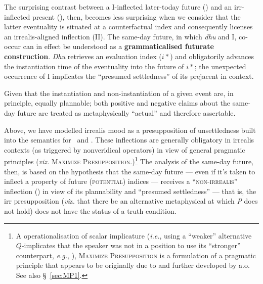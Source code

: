 The surprising contrast between a \gls{I}-inflected later-today future () and an \gls{irr}-inflected present (), then, becomes less surprising when we consider that the latter eventuality is situated at a counterfactual index and consequently licenses an irrealis-aligned inflection (\gls{II}). The same-day future, in which \textit{dhu} and \gls{I}, co-occur can in effect be understood as a \textbf{grammaticalised futurate construction}. \textit{Dhu} retrieves an evaluation index ($ i* $) and obligatorily advances the instantiation time of the eventuality into the future of $ i* $; the unexpected occurrence of \gls{I} implicates the ``presumed settledness'' of its prejacent in context.

 Given that the instantiation and non-instantiation of a given event are, in principle, equally plannable; both positive and negative claims about the same-day future are treated as metaphysically ``actual'' and therefore assertable.

Above, we have modelled irrealis mood as a presupposition of unsettledness built into the semantics for \II~and \IV. These inflections are generally obligatory in irrealis contexts (as triggered by nonveridical operators) in view of general pragmatic principles (\textit{viz.} \textsc{Maximize Presupposition.)}\footnote{A operationalisation of scalar implicature (\textit{i.e.}, using a ``weaker'' alternative $ Q $-implicates that the speaker was not in a position to use its ``stronger'' counterpart,\textit{ e.g.}, \citealt{Horn1984}), \textsc{Maximize Presupposition} is a formulation of a pragmatic principle that appears to be originally due to \citet{Heim1991} and further developed by \citet{Sauerland2009,Percus2006} a.o. See also \S~\ref{sec:MP1}.} The analysis of the same-day future, then, is based on the hypothesis that the same-day future --- even if it's taken to inflect a property of future (\textsc{potential}) indices --- receives a ``\textsc{non-irrealis}'' inflection (\I{}) in view of its plannability and ``presumed settledness'' --- that is, the \gls{irr} presupposition (\textit{vi}z. that there be an alternative metaphysical at which \textit{P} does not hold) does not have the status of a truth condition.


